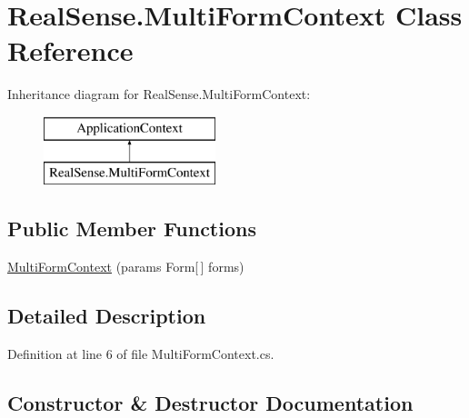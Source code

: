 \hypertarget{class_real_sense_1_1_multi_form_context}{}\section{Real\+Sense.\+Multi\+Form\+Context Class Reference}
\label{class_real_sense_1_1_multi_form_context}
Inheritance diagram for Real\+Sense.\+Multi\+Form\+Context\+:\begin{figure}[H]
\begin{center}
\leavevmode
\includegraphics[height=2.000000cm]{class_real_sense_1_1_multi_form_context}
\end{center}
\end{figure}
\subsection*{Public Member Functions}
\begin{DoxyCompactItemize}
\item 
\hyperlink{class_real_sense_1_1_multi_form_context_a509b28300a328d9fad769c6036f8af33}{Multi\+Form\+Context} (params Form\mbox{[}$\,$\mbox{]} forms)
\end{DoxyCompactItemize}


\subsection{Detailed Description}


Definition at line 6 of file Multi\+Form\+Context.\+cs.



\subsection{Constructor \& Destructor Documentation}
\mbox{\label{class_real_sense_1_1_multi_form_context_a509b28300a328d9fad769c6036f8af33}} 
